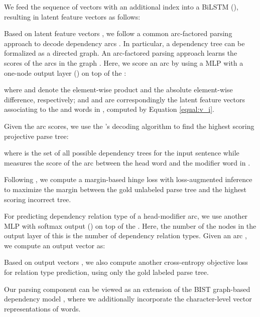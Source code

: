\documentclass[11pt,letterpaper]{article}
\begin{document}
We feed the sequence of vectors  with an additional index  into a  BiLSTM (), resulting in latent feature vectors  as follows:



Based on latent feature vectors , we follow a common arc-factored parsing approach to decode dependency arcs \citep{McDonald2005OLT}. 
 In particular,  a dependency tree  can be formalized as a directed graph.  An arc-factored parsing approach learns the scores of the arcs in the graph \citep{Kubler2009}. 
Here, we score an arc by using a MLP with a one-node output layer () on top of the :

\vspace{-15pt}
  

\noindent where  and  denote the element-wise product and the absolute element-wise difference, respectively;  and  and  are correspondingly  the  latent feature vectors associating to the  and  words in ,  computed by Equation \ref{equal:v_i}. 
 

 
Given the arc scores, we use the \citet{Eisner:1996}'s decoding  algorithm to find the highest scoring projective parse tree:

\vspace{-10pt}


\noindent where  is the set of all possible dependency trees for the input sentence  while  measures the score of the arc between the head  word and the modifier  word in  . 



Following  \citet{TACL885}, we compute a  margin-based hinge loss \textbf{} with loss-augmented inference  to maximize the margin between the gold unlabeled parse tree and the highest scoring incorrect tree.


For predicting dependency relation type of a head-modifier arc, we use another MLP with softmax output () on top of the . Here, the number of the nodes in the output layer of this   is the number of dependency relation types.  Given an arc , we compute an  output vector as:

\vspace{-15pt}
  

Based on output vectors , we also compute another cross-entropy objective loss \textbf{}  for relation type prediction, using only the gold labeled parse tree.    

Our parsing component  can be viewed as an extension of the  BIST graph-based dependency model  \citep{TACL885}, where we additionally incorporate  the character-level vector representations of words.
\end{document}

